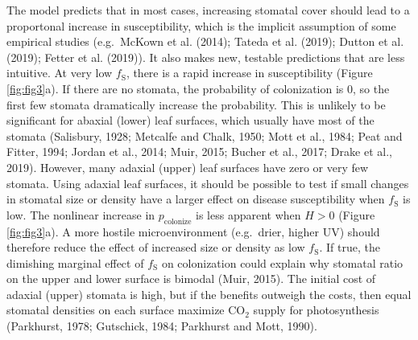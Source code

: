 \documentclass[utf8]{frontiersSCNS}
\newcommand{\fs}{$f_\text{S}$}
\begin{document}
The model predicts that in most cases, increasing stomatal cover should
lead to a proportonal increase in susceptibility, which is the implicit
assumption of some empirical studies (e.g.~McKown et al. (2014); Tateda
et al. (2019); Dutton et al. (2019); Fetter et al. (2019)). It also
makes new, testable predictions that are less intuitive. At very low
\fs, there is a rapid increase in susceptibility (Figure
\ref{fig:fig3}a). If there are no stomata, the probability of
colonization is 0, so the first few stomata dramatically increase the
probability. This is unlikely to be significant for abaxial (lower) leaf
surfaces, which usually have most of the stomata (Salisbury, 1928;
Metcalfe and Chalk, 1950; Mott et al., 1984; Peat and Fitter, 1994;
Jordan et al., 2014; Muir, 2015; Bucher et al., 2017; Drake et al.,
2019). However, many adaxial (upper) leaf surfaces have zero or very few
stomata. Using adaxial leaf surfaces, it should be possible to test if
small changes in stomatal size or density have a larger effect on
disease susceptibility when \fs{} is low. The nonlinear increase in
\(p_\text{colonize}\) is less apparent when \(H > 0\) (Figure
\ref{fig:fig3}a). A more hostile microenvironment (e.g.~drier, higher
UV) should therefore reduce the effect of increased size or density as
low \fs. If true, the dimishing marginal effect of \fs{} on colonization
could explain why stomatal ratio on the upper and lower surface is
bimodal (Muir, 2015). The initial cost of adaxial (upper) stomata is
high, but if the benefits outweigh the costs, then equal stomatal
densities on each surface maximize CO\(_2\) supply for photosynthesis
(Parkhurst, 1978; Gutschick, 1984; Parkhurst and Mott, 1990).
\end{document}
